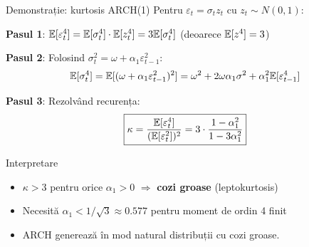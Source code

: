 \documentclass[9pt, aspectratio=169, t]{beamer}
\begin{document}
\begin{frame}{Demonstrație: kurtosis ARCH(1)}
    \small
        Pentru $\varepsilon_t = \sigma_t z_t$ cu $z_t \sim N(0,1)$:

        \textbf{Pasul 1}: $\mathbb{E}[\varepsilon_t^4] = \mathbb{E}[\sigma_t^4] \cdot \mathbb{E}[z_t^4] = 3 \mathbb{E}[\sigma_t^4]$ \quad (deoarece $\mathbb{E}[z^4] = 3$)

        \textbf{Pasul 2}: Folosind $\sigma_t^2 = \omega + \alpha_1 \varepsilon_{t-1}^2$:
        \[
            \mathbb{E}[\sigma_t^4] = \mathbb{E}[(\omega + \alpha_1 \varepsilon_{t-1}^2)^2] = \omega^2 + 2\omega\alpha_1 \sigma^2 + \alpha_1^2 \mathbb{E}[\varepsilon_{t-1}^4]
        \]

        \textbf{Pasul 3}: Rezolvând recurența:
        \[
            \boxed{\kappa = \frac{\mathbb{E}[\varepsilon_t^4]}{(\mathbb{E}[\varepsilon_t^2])^2} = 3 \cdot \frac{1 - \alpha_1^2}{1 - 3\alpha_1^2}}
        \]

        \begin{block}{Interpretare}
            \begin{itemize}
                \item $\kappa > 3$ pentru orice $\alpha_1 > 0$ $\Rightarrow$ \textbf{cozi groase} (leptokurtosis)
                \item Necesită $\alpha_1 < 1/\sqrt{3} \approx 0.577$ pentru moment de ordin 4 finit
                \item ARCH generează în mod natural distribuții cu cozi groase.
            \end{itemize}
        \end{block}
\end{frame}


\end{document}
